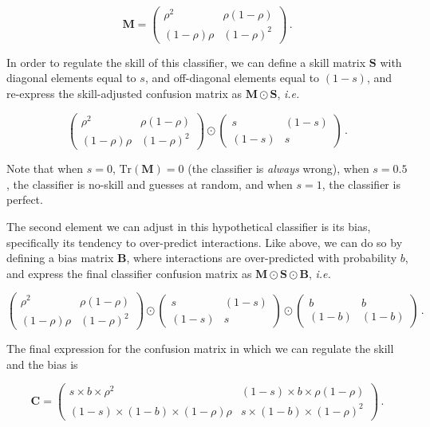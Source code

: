 \documentclass[11pt]{article}
\begin{document}
\[
\mathbf{M} = \begin{pmatrix}
    \rho^2 & \rho (1-\rho) \\
    (1-\rho) \rho & (1-\rho)^2
\end{pmatrix} \,.
\]

In order to regulate the skill of this classifier, we can define a skill
matrix \(\mathbf{S}\) with diagonal elements equal to \(s\), and
off-diagonal elements equal to \((1-s)\), and re-express the
skill-adjusted confusion matrix as \(\mathbf{M} \odot \mathbf{S}\),
\emph{i.e.}

\[
\begin{pmatrix}
    \rho^2 & \rho (1-\rho) \\
    (1-\rho) \rho & (1-\rho)^2
\end{pmatrix} \odot \begin{pmatrix}
    s & (1-s) \\
    (1-s) & s
\end{pmatrix} \,.
\]

Note that when \(s=0\), \(\text{Tr}(\mathbf{M}) = 0\) (the classifier is
\emph{always} wrong), when \(s=0.5\), the classifier is no-skill and
guesses at random, and when \(s=1\), the classifier is perfect.

The second element we can adjust in this hypothetical classifier is its
bias, specifically its tendency to over-predict interactions. Like
above, we can do so by defining a bias matrix \(\mathbf{B}\), where
interactions are over-predicted with probability \(b\), and express the
final classifier confusion matrix as
\(\mathbf{M}\odot \mathbf{S}\odot \mathbf{B}\), \emph{i.e.}

\[
\begin{pmatrix}
    \rho^2 & \rho (1-\rho) \\
    (1-\rho) \rho & (1-\rho)^2
\end{pmatrix} \odot \begin{pmatrix}
    s & (1-s) \\
    (1-s) & s
\end{pmatrix} \odot \begin{pmatrix}
    b & b \\
    (1-b) & (1-b)
\end{pmatrix}\,.
\]

The final expression for the confusion matrix in which we can regulate
the skill and the bias is

\[
\mathbf{C} = \begin{pmatrix}
    s\times b\times \rho^2 & (1-s)\times b\times \rho (1-\rho) \\
    (1-s)\times (1-b)\times (1-\rho) \rho & s\times (1-b)\times (1-\rho)^2
\end{pmatrix} \,.
\]
\end{document}
